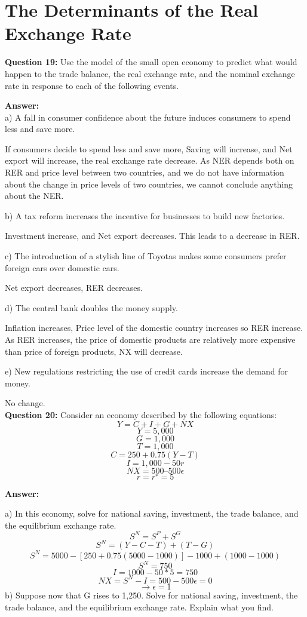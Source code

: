 \documentclass[a4paper, 11pt]{article}
\begin{document}
\section{The Determinants of the Real Exchange Rate}

\textbf{Question 19:} Use the model of the small open economy to predict what would happen to the trade balance, the real exchange rate, and the nominal exchange rate in response to each of the following events.

\textbf{Answer:} \\
a) A fall in consumer confidence about the future induces consumers to spend less and save more.

If consumers decide to spend less and save more, Saving will increase, and Net export will increase, the real exchange rate decrease. As NER depends both on RER and price level between two countries, and we do not have information about the change in price levels of two countries, we cannot conclude anything about the NER.
 
b) A tax reform increases the incentive for businesses to build new factories.

Investment increase, and Net export decreases. This leads to a decrease in RER.

c) The introduction of a stylish line of Toyotas makes some consumers prefer foreign cars over domestic cars.

Net export decreases, RER decreases.

d) The central bank doubles the money supply.

Inflation increases, Price level of the domestic country increases so RER increase. As RER increases, the price of domestic products are relatively more expensive than price of foreign products, NX will decrease.

e) New regulations restricting the use of credit cards increase the demand for money.

No change. \\

\textbf{Question 20:} Consider an economy described by the following equations:
$$Y = C + I + G + NX$$
$$Y = 5,000$$
$$G = 1,000$$
$$T = 1,000$$
$$C = 250 + 0.75(Y − T)$$
$$I = 1,000 − 50r$$
$$NX = 500 – 500\epsilon$$
$$r = r^{∗} = 5$$

\textbf{Answer:} 

a) In this economy, solve for national saving, investment, the trade balance, and the equilibrium exchange rate.
$$S^{N} = S^{P} + S^{G}$$
$$S^{N} = (Y-C-T) + (T-G)$$
$$S^{N} = 5000 - [250 + 0.75(5000 - 1000)] - 1000 + (1000 - 1000)$$
$$S^{N} = 750$$
$$I = 1000 - 50*5 = 750$$
$$NX = S^{N} - I = 500 - 500\epsilon = 0$$
$$\rightarrow \epsilon = 1$$
b) Suppose now that G rises to 1,250. Solve for national saving, investment, the trade balance, and the equilibrium exchange rate. Explain what you find.
\end{document}
